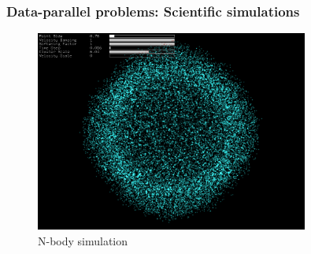 \documentclass{beamer}
\begin{document}
\begin{frame}
  \frametitle{Data-parallel problems: Scientific simulations}
  \begin{figure}
    \centering
    \includegraphics[width=0.8\textwidth]{graphics/opencl_nbody.jpg}
    \caption{N-body simulation}
\label{fig:simulation}
\end{figure}

\end{frame}

\end{document}
